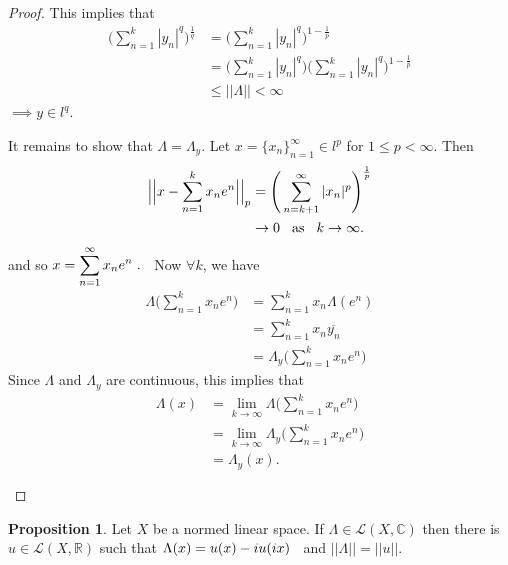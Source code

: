 \documentclass[11pt,a4paper]{article}
\theoremstyle{definition}
\newtheorem{prop}[thm]{Proposition}
\begin{document}
\begin{proof}
This implies that 
\begin{align*}
\Bigg(\sum^k_{n=1}|y_n|^q\Bigg)^{\frac{1}{q}} &=\Bigg(\sum^k_{n=1}|y_n|^q\Bigg)^{1-\frac{1}{p}}\\
                                              &=\Bigg(\sum^k_{n=1}|y_n|^q\Bigg)\Bigg(\sum^k_{n=1}|y_n|^q\Bigg)^{1-\frac{1}{p}}\\
                                              &\leq ||\Lambda||
                                               <\infty
\end{align*}
$\implies y\in l^q$.

It remains to show that $\Lambda =\Lambda_y$.
Let $x=\{x_n\}^{\infty}_{n=1} \in l^p$ for $1\leq p<\infty$. Then
\begin{align*}
\Big|\Big|x-\sum^k_{n=1}x_ne^n\Big|\Big|_p &=\Bigg(\sum^{\infty}_{n=k+1}|x_n|^p\Bigg)^{\frac{1}{p}}\\
                                           &\rightarrow 0\hspace{0.3cm} \text{as}\hspace{0.3cm} k\rightarrow \infty.
\end{align*}
 and so \hspace{0.3cm}$\displaystyle{ x=\sum^{\infty}_{n=1}x_ne^n}\hspace{0.1cm}.\hspace{0.2cm}$
 Now $\forall k$, we have
 \begin{align*}
 \Lambda \Bigg(\sum^k_{n=1}x_ne^n\Bigg) &=\sum^k_{n=1}x_n\Lambda(e^n)\\
                                        &=\sum^k_{n=1}x_n\overline{y_n}\\
                                        &=\Lambda_y \Bigg(\sum^k_{n=1}x_ne^n\Bigg)
 \end{align*}
Since $\Lambda$ and $\Lambda_y$ are continuous, this implies that 
\begin{align*}
\Lambda(x) &=\lim_{k\rightarrow \infty}\Lambda \Bigg(\sum^k_{n=1}x_ne^n\Bigg)\\
           &=\lim_{k\rightarrow \infty}\Lambda_y\Bigg(\sum^k_{n=1}x_ne^n\Bigg)\\
           &=\Lambda_y(x).\\\\
\end{align*}
\end{proof}


\begin{prop}
Let $X$ be a normed linear space. If $\Lambda \in \mathcal{L}(X,\mathbb{C})$ then there is $u\in \mathcal{L}(X,\mathbb{R})$ such that \hspace{0.2cm}$\Lambda(x)=u(x)-iu(ix)\hspace{0.2cm}$ and $||\Lambda||=||u||$.

\end{prop}
\end{document}
